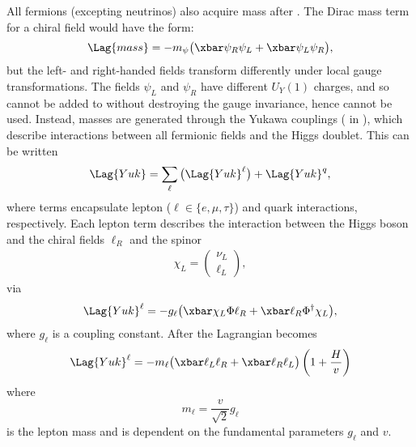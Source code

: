 All fermions (excepting neutrinos) also acquire mass after \SSB.
The Dirac mass term for a chiral field would have the form:
\begin{equation}
  \Lag{mass} = -m_\psi\big(\xbar\psi_R\psi_L + \xbar\psi_L\psi_R\big),
  \label{eq:diracmass}
\end{equation}
but the left- and right-handed fields
transform differently under local gauge transformations.
The fields $\psi_L$ and $\psi_R$ have different $U_Y(1)$ charges,
and so cannot be added to  without destroying the gauge invariance, hence 
cannot be used.
Instead, masses are generated through the Yukawa couplings ( in ), which
describe interactions between all fermionic fields and the Higgs doublet.
This can be written
\begin{equation}
  \Lag{Yuk} = \sum_{\ell}\big(\Lag{Yuk}^\ell\big) + \Lag{Yuk}^q,
  \label{eq:th:yukking}
\end{equation}
where terms encapsulate lepton ($\ell\in\{e,\mu,\tau\}$) and quark interactions, respectively.
Each lepton term describes the interaction between the Higgs boson and the chiral fields
$\ell_R$ and the spinor
\begin{align}
  \chi_L = \begin{pmatrix}\nu_L \\ \ell_L \end{pmatrix},
\end{align}
via
\begin{equation}
  \Lag{Yuk}^\ell
  = - g_\ell\big(\xbar\chi_L\Phi \ell_R + \xbar \ell_R\Phi^\dagger\chi_L\big),
\end{equation}
where $g_\ell$ is a coupling constant.
After \SSB the Lagrangian becomes
\begin{align}
  \Lag{Yuk}^\ell
  = - m_\ell \big(\xbar\ell_L\ell_R + \xbar\ell_R\ell_L\big)%
  \left(1 + \frac{H}{v}\right)
\end{align}
where
\begin{equation}
  m_\ell = \frac{v}{\sqrt{2}}g_\ell
  \label{eq:leptonmass}
\end{equation}
is the lepton mass and is dependent on the fundamental \sm parameters $g_\ell$ and $v$.

